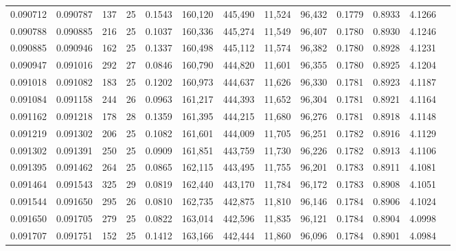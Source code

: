 \begin{tabular}{rrrrrrrrrrrrr}
0.090712 & 0.090787 & 137 &  25 &                                     0.1543 & 160,120 & 445,490 &  11,524 &  96,432 & 0.1779 & 0.8933 & 4.1266 \\
0.090788 & 0.090885 & 216 &  25 &                                     0.1037 & 160,336 & 445,274 &  11,549 &  96,407 & 0.1780 & 0.8930 & 4.1246 \\
0.090885 & 0.090946 & 162 &  25 &                                     0.1337 & 160,498 & 445,112 &  11,574 &  96,382 & 0.1780 & 0.8928 & 4.1231 \\
0.090947 & 0.091016 & 292 &  27 &                                     0.0846 & 160,790 & 444,820 &  11,601 &  96,355 & 0.1780 & 0.8925 & 4.1204 \\
0.091018 & 0.091082 & 183 &  25 &                                     0.1202 & 160,973 & 444,637 &  11,626 &  96,330 & 0.1781 & 0.8923 & 4.1187 \\
0.091084 & 0.091158 & 244 &  26 &                                     0.0963 & 161,217 & 444,393 &  11,652 &  96,304 & 0.1781 & 0.8921 & 4.1164 \\
0.091162 & 0.091218 & 178 &  28 &                                     0.1359 & 161,395 & 444,215 &  11,680 &  96,276 & 0.1781 & 0.8918 & 4.1148 \\
0.091219 & 0.091302 & 206 &  25 &                                     0.1082 & 161,601 & 444,009 &  11,705 &  96,251 & 0.1782 & 0.8916 & 4.1129 \\
0.091302 & 0.091391 & 250 &  25 &                                     0.0909 & 161,851 & 443,759 &  11,730 &  96,226 & 0.1782 & 0.8913 & 4.1106 \\
0.091395 & 0.091462 & 264 &  25 &                                     0.0865 & 162,115 & 443,495 &  11,755 &  96,201 & 0.1783 & 0.8911 & 4.1081 \\
0.091464 & 0.091543 & 325 &  29 &                                     0.0819 & 162,440 & 443,170 &  11,784 &  96,172 & 0.1783 & 0.8908 & 4.1051 \\
0.091544 & 0.091650 & 295 &  26 &                                     0.0810 & 162,735 & 442,875 &  11,810 &  96,146 & 0.1784 & 0.8906 & 4.1024 \\
0.091650 & 0.091705 & 279 &  25 &                                     0.0822 & 163,014 & 442,596 &  11,835 &  96,121 & 0.1784 & 0.8904 & 4.0998 \\
0.091707 & 0.091751 & 152 &  25 &                                     0.1412 & 163,166 & 442,444 &  11,860 &  96,096 & 0.1784 & 0.8901 & 4.0984 \\

\end{tabular}
